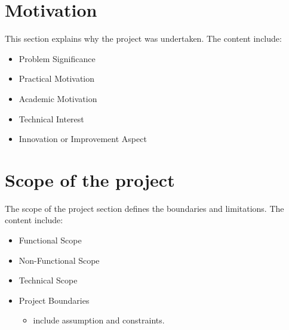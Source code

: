 \section{Motivation}
\label{sec:introduction-motivation}
This section explains why the project was undertaken. The content include:
\begin{itemize}
	\item Problem Significance
	\item Practical Motivation
	\item Academic Motivation
	\item Technical Interest
	\item Innovation or Improvement Aspect
\end{itemize}

\section{Scope of the project}
\label{sec:introduction-scope}
The scope of the project section defines the boundaries and limitations. The content include:
\begin{itemize}
	\item Functional Scope
	\item Non-Functional Scope
	\item Technical Scope
	\item Project Boundaries 
		\begin{itemize}
			\item include assumption and constraints.
		\end{itemize}
\end{itemize}
